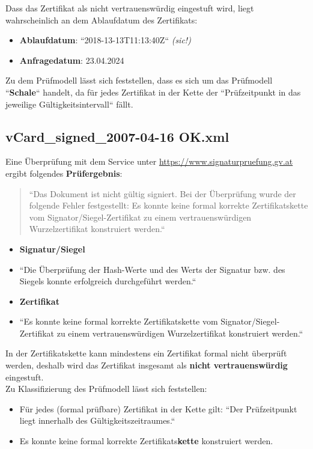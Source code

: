 \noindent
Dass das Zertifikat als nicht vertrauenswürdig eingestuft wird, liegt wahrscheinlich an dem Ablaufdatum des Zertifikats:

\begin{itemize}
    \itemsep0.5em
    \item \textbf{Ablaufdatum}: ``2018-13-13T11:13:40Z``  \textit{(sic!)}
    \item \textbf{Anfragedatum}: 23.04.2024
\end{itemize}

\noindent
Zu dem Prüfmodell lässt sich feststellen, dass es sich um das Prüfmodell ``\textbf{Schale}`` handelt, da für jedes Zertifikat in der Kette der ``Prüfzeitpunkt in das jeweilige Gültigkeitsintervall`` fällt.

\subsection*{vCard\_signed\_2007-04-16 OK.xml}

Eine Überprüfung mit dem Service unter \url{https://www.signaturpruefung.gv.at} ergibt folgendes \textbf{Prüfergebnis}:

\blockquote[]{
    ``Das Dokument ist nicht gültig signiert. Bei der Überprüfung wurde der folgende Fehler festgestellt: Es konnte keine formal korrekte Zertifikatskette vom Signator/Siegel-Zertifikat zu einem vertrauenswürdigen Wurzelzertifikat konstruiert werden.``
}

\begin{itemize}
    \itemsep0.5em
    \item \textbf{Signatur/Siegel}
    \item[] ``Die Überprüfung der Hash-Werte und des Werts der Signatur bzw. des Siegels konnte erfolgreich durchgeführt werden.``
    \item \textbf{Zertifikat}
    \item[] ``Es konnte keine formal korrekte Zertifikatskette vom Signator/Siegel-Zertifikat zu einem vertrauenswürdigen Wurzelzertifikat konstruiert werden.``
\end{itemize}

\noindent
In der Zertifikatskette kann mindestens ein Zertifikat formal nicht überprüft werden, deshalb wird das Zertifikat insgesamt als \textbf{nicht vertrauenswürdig} eingestuft.\\

\noindent
Zu Klassifizierung des Prüfmodell lässt sich feststellen:

\begin{itemize}
    \itemsep0.5em
    \item Für jedes (formal prüfbare) Zertifikat in der Kette gilt: ``Der Prüfzeitpunkt liegt innerhalb des Gültigkeitszeitraumes.``
    \item Es konnte keine formal korrekte Zertifikats\textbf{kette} konstruiert werden.
\end{itemize}

